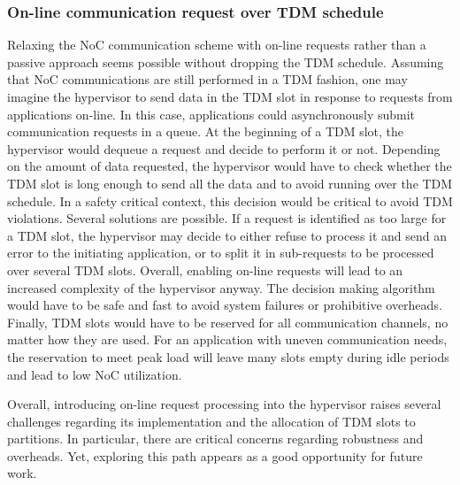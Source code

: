 \documentclass[main.tex]{subfiles}
\begin{document}
\subsubsection{On-line communication request over TDM schedule}
Relaxing the NoC communication scheme with on-line requests rather than a passive approach seems possible without dropping the TDM schedule. Assuming that NoC communications are still performed in a TDM fashion, one may imagine the hypervisor to send data in the TDM slot in response to requests from applications on-line. In this case, applications could asynchronously submit communication requests in a queue. At the beginning of a TDM slot, the hypervisor would dequeue a request and decide to perform it or not. Depending on the amount of data requested, the hypervisor would have to check whether the TDM slot is long enough to send all the data and to avoid running over the TDM schedule. In a safety critical context, this decision would be critical to avoid TDM violations. Several solutions are possible. If a request is identified as too large for a TDM slot, the hypervisor may decide to either refuse to process it and send an error to the initiating application, or to split it in sub-requests to be processed over several TDM slots. Overall, enabling on-line requests will lead to an increased complexity of the hypervisor anyway. The decision making algorithm would have to be safe and fast to avoid system failures or prohibitive overheads. 
Finally, TDM slots would have to be reserved for all communication channels, no matter how they are used. For an application with uneven communication needs, the reservation to meet peak load will leave many slots empty during idle periods and lead to low NoC utilization.

Overall, introducing on-line request processing into the hypervisor raises several challenges regarding its implementation and the allocation of TDM slots to partitions. In particular, there are critical concerns regarding robustness and overheads. Yet, exploring this path appears as a good opportunity for future work.
\end{document}
